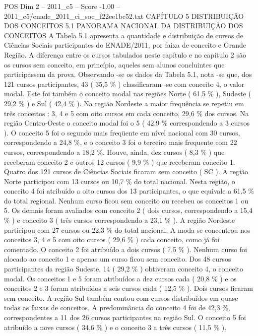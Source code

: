 \begin{textsample}{POS Dim 2 – 2011\_c5 – Score -1.00 – 2011\_c5/enade\_2011\_ci\_soc\_f22ee1bc52.txt}  \label{ex:f2_pos_347}
CAPÍTULO 5 DISTRIBUIÇÃO DOS CONCEITOS 5.1 PANORAMA NACIONAL DA DISTRIBUIÇÃO DOS CONCEITOS A Tabela 5.1 apresenta a quantidade e distribuição de cursos de Ciências Sociais participantes do ENADE/2011, por faixa de conceito e Grande Região.
A diferença entre os cursos tabulados neste capítulo e no capítulo 2 são os cursos sem conceito, em princípio, aqueles sem alunos concluintes que participassem da prova.
Observando -se os dados da Tabela 5.1, nota -se que, dos 121 cursos participantes, 43 ( 35,5 \% ) classificaram -se com conceito 4, o valor modal.
Este foi também o conceito modal nas regiões Norte ( 61,5 \% ), Sudeste ( 29,2 \% ) e Sul ( 42,4 \% ).
Na região Nordeste a maior frequência se repetiu em três conceitos : 3, 4 e 5 com oito cursos em cada conceito, 29,6 \% dos cursos.
Na região Centro-Oeste o conceito modal foi o 5 ( 42,9 \% correspondendo a 3 cursos ).
O conceito 5 foi o segundo mais freqüente em nível nacional com 30 cursos, correspondendo a 24,8 \%, e o conceito 3 foi o terceiro mais frequente com 22 cursos, correspondendo a 18,2 \%.
Houve, ainda, dez cursos ( 8,3 \% ) que receberam conceito 2 e outros 12 cursos ( 9,9 \% ) que receberam conceito 1.
Quatro dos 121 cursos de Ciências Sociais ficaram sem conceito ( SC ).
A região Norte participou com 13 cursos ou 10,7 \% do total nacional.
Nesta região, o conceito 4 foi atribuído a oito cursos dos 13 participantes, o que equivale a 61,5 \% do total regional.
Nenhum curso ficou sem conceito ou recebeu os conceitos 1 ou 5.
Os demais foram avaliados com conceito 2 ( dois cursos, correspondendo a 15,4 \% ) e conceito 3 ( três cursos correspondendo a 23,1 \% ).
A região Nordeste participou com 27 cursos ou 22,3 \% do total nacional.
A moda se concentrou nos conceitos 3, 4 e 5 com oito cursos ( 29,6 \% ) cada conceito, como já foi comentado.
O conceito 2 foi atribuído a dois cursos ( 7,5 \% ).
Nenhum curso foi alocado ao conceito 1 e apenas um curso ficou sem conceito.
Dos 48 cursos participantes da região Sudeste, 14 ( 29,2 \% ) obtiveram conceito 4, o conceito modal.
Os conceitos 1 e 5 foram atribuídos a dez cursos cada ( 20,8 \% ) e os conceitos 2 e 3 foram atribuídos a seis cursos cada ( 12,5 \% ).
Dois cursos ficaram sem conceito.
A região Sul também contou com cursos distribuídos em quase todas as faixas de conceitos.
A predominância do conceito 4 foi de 42,3 \%, correspondentes a 11 dos 26 cursos participantes na região Sul.
O conceito 5 foi atribuído a nove cursos ( 34,6 \% ) e o conceito 3 a três cursos ( 11,5 \% ).

\end{textsample}
